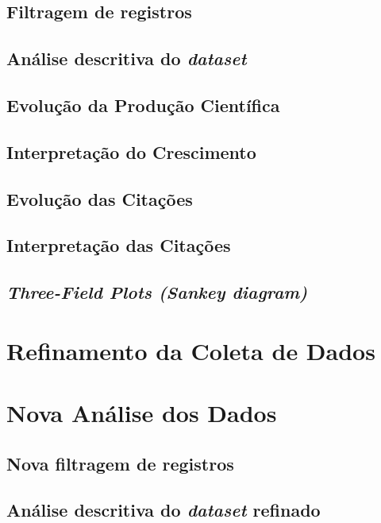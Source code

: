 \subsection{Filtragem de registros}

\subsection{Análise descritiva do \textit{dataset} }

\subsection{Evolução da Produção Científica}

\subsection{Interpretação do Crescimento}

\subsection{Evolução das Citações}

\subsection{Interpretação das Citações}

\subsection{\textit{Three-Field Plots (Sankey diagram)}}

\section{Refinamento da Coleta de Dados}

\section{Nova Análise dos Dados}

\subsection{Nova filtragem de registros}

\subsection{Análise descritiva do \textit{dataset} refinado}
